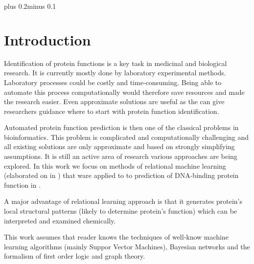 \documentclass[11pt,twoside,a4paper]{book}
\begin{document}

\mainbodystarts
\normalfont
{}\baselineskip plus 0.2\baselineskip minus 0.1\baselineskip



% 
% 

\chapter{Introduction}
Identification of protein functions is a key task in medicinal and biological research.
It is currently mostly done by laboratory experimental methods.
Laboratory processes could be costly and time-consuming. 
Being able to automate this process computationally would therefore save resources
and made the research easier.
Even approximate solutions are useful as the can give researchers guidance where
to start with protein function identification.

Automated protein function prediction is then one of the classical problems in bioinformatics. 
This problem is complicated and computationally challenging and all existing solutions
are only approximate and based on strongly simplifying assumptions.
It is still an active area of research various approaches are being explored. 
In this work we focus on methods of relational machine learning (elaborated on in \cite{kuzelka}\cite{relf})
that ware applied to to prediction of DNA-binding protein function in \cite{szabova}.

A major advantage of relational learning approach is that it generates protein's local structural patterns
(likely to determine protein's function) which can be interpreted and examined chemically.

This work assumes that reader knows
the techniques of well-know machine learning algorithms (mainly Suppor Vector Machines),
Bayesian networks
and the formalism of first order logic and graph theory.
\end{document}
